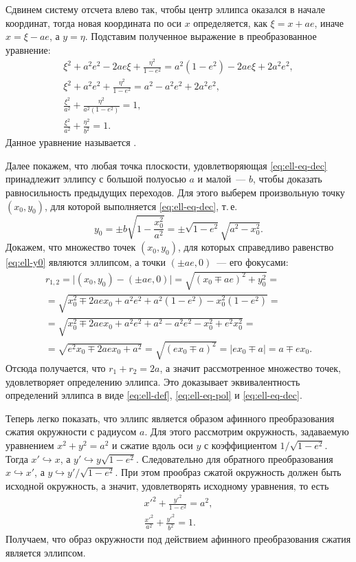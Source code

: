 Сдвинем систему отсчета влево так, чтобы центр эллипса оказался в начале координат, тогда новая координата по оси $x$ определяется, как $\xi = x + ae$, иначе $x = \xi - ae$, а $y = \eta$. Подставим полученное выражение в преобразованное уравнение:
\begin{gather*}
    \xi^2 + a^2 e^2 - 2ae\xi + \frac{\eta^2}{1 - e^2} = a^2 (1 - e^2) - 2 ae\xi + 2 a^2 e^2,\\
    \xi^2 + a^2 e^2  + \frac{\eta^2}{1 - e^2} = a^2 - a^2 e^2 + 2 a^2 e^2,\\
    \frac{\xi^2}{a^2} + \frac{\eta^2}{a^2 (1 - e^2)} = 1,\\
    \frac{\xi^2}{a^2} + \frac{\eta^2}{b^2} = 1. \tag{\theequation} \label{eq:ell-eq-dec}
\end{gather*}
Данное уравнение называется .

Далее покажем, что любая точка плоскости, удовлетворяющая \eqref{eq:ell-eq-dec} принадлежит эллипсу с большой полуосью $a$ и малой~--- $b$, чтобы доказать равносильность предыдущих переходов. Для этого выберем произвольную точку $(x_0, y_0)$, для которой выполняется \eqref{eq:ell-eq-dec}, т.\,е.
\begin{equation}
    y_0 = \pm b \sqrt{1 - \frac{x_0^2}{a^2}} = \pm \sqrt{1 - e^2} \sqrt{a^2 - x_0^2}. \label{eq:ell-y0}
\end{equation}
Докажем, что множество точек $(x_0, y_0)$, для которых справедливо равенство \eqref{eq:ell-y0} являются эллипсом, а точки $(\pm a e, 0)$~--- его фокусами:
\begin{multline*}
    r_{1,2}
    = \big| (x_0, y_0) - (\pm ae, 0) \big|
    = \sqrt{(x_0 \mp ae)^2 + y_0^2} =\\
    = \sqrt{x_0^2 \mp 2 a e x_0 + a^2 e^2 + a^2(1 - e^2) - x_0^2(1 - e^2)} =\\
    = \sqrt{x_0^2 \mp 2 a e x_0 + a^2 e^2 + a^2 - a^2 e^2 - x_0^2 + e^2 x_0^2} = \\
    = \sqrt{e^2 x_0 \mp 2 a e x_0 + a^2 } = \sqrt{(e x_0 \mp a)^2} = |e x_0 \mp a| = a \mp ex_0.
\end{multline*}
Отсюда получается, что $r_1 + r_2 = 2a$, а значит рассмотренное множество точек, удовлетворяет определению эллипса. Это доказывает эквивалентность определений эллипса в виде \eqref{eq:ell-def}, \eqref{eq:ell-eq-pol} и \eqref{eq:ell-eq-dec}.

Теперь легко показать, что эллипс является образом афинного преобразования сжатия окружности с радиусом $a$. Для этого рассмотрим окружность, задаваемую уравнением $x^2 + y^2 = a^2$ и сжатие вдоль оси $y$ с коэффициентом $1/\sqrt{1 - e^2}$. Тогда $x' \hookrightarrow x$, а $y' \hookrightarrow y \sqrt{1-e^2}$. Следовательно для обратного преобразования $x \hookrightarrow x'$, а $y \hookrightarrow y'/\sqrt{1 - e^2}$. При этом прообраз сжатой окружность должен быть исходной окружность, а значит, удовлетворять исходному уравнения, то есть
\begin{gather*}
    x'^2 + \frac{y'^2}{1 - e^2} = a^2,\\
    \frac{x'^2}{a^2} + \frac{y'^2}{b^2} = 1.
\end{gather*}
Получаем, что образ окружности под действием афинного преобразования сжатия является эллипсом.

